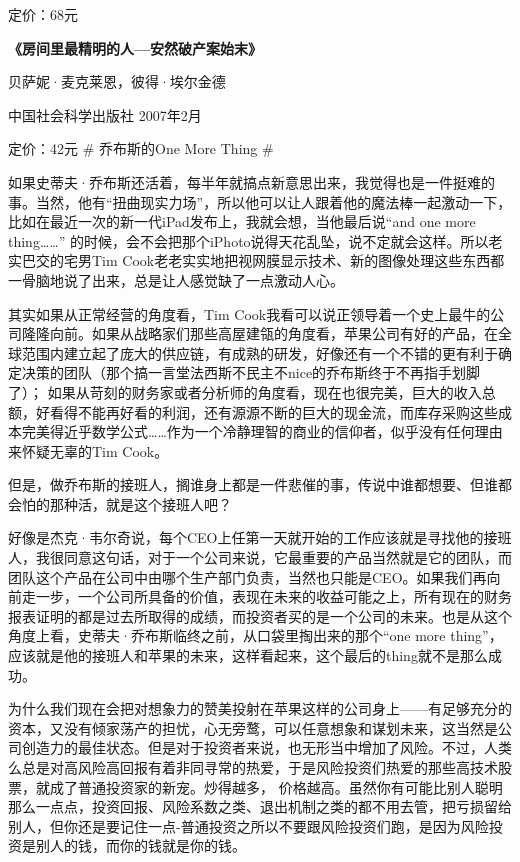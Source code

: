 定价：68元

\textbf{《房间里最精明的人---安然破产案始末》}

贝萨妮·麦克莱恩，彼得·埃尔金德

中国社会科学出版社 2007年2月

定价：42元 \# 乔布斯的One More Thing \#

如果史蒂夫·乔布斯还活着，每半年就搞点新意思出来，我觉得也是一件挺难的事。当然，他有``扭曲现实力场''，所以他可以让人跟着他的魔法棒一起激动一下，比如在最近一次的新一代iPad发布上，我就会想，当他最后说``and
one more thing\ldots{}\ldots{}''
的时候，会不会把那个iPhoto说得天花乱坠，说不定就会这样。所以老实巴交的宅男Tim
Cook老老实实地把视网膜显示技术、新的图像处理这些东西都一骨脑地说了出来，总是让人感觉缺了一点激动人心。

其实如果从正常经营的角度看，Tim
Cook我看可以说正领导着一个史上最牛的公司隆隆向前。如果从战略家们那些高屋建瓴的角度看，苹果公司有好的产品，在全球范围内建立起了庞大的供应链，有成熟的研发，好像还有一个不错的更有利于确定决策的团队（那个搞一言堂法西斯不民主不nice的乔布斯终于不再指手划脚了）；
如果从苛刻的财务家或者分析师的角度看，现在也很完美，巨大的收入总额，好看得不能再好看的利润，还有源源不断的巨大的现金流，而库存采购这些成本完美得近乎数学公式\ldots{}\ldots{}作为一个冷静理智的商业的信仰者，似乎没有任何理由来怀疑无辜的Tim
Cook。

但是，做乔布斯的接班人，搁谁身上都是一件悲催的事，传说中谁都想要、但谁都会怕的那种活，就是这个接班人吧？

好像是杰克·韦尔奇说，每个CEO上任第一天就开始的工作应该就是寻找他的接班人，我很同意这句话，对于一个公司来说，它最重要的产品当然就是它的团队，而团队这个产品在公司中由哪个生产部门负责，当然也只能是CEO。如果我们再向前走一步，一个公司所具备的价值，表现在未来的收益可能之上，所有现在的财务报表证明的都是过去所取得的成绩，而投资者买的是一个公司的未来。也是从这个角度上看，史蒂夫·乔布斯临终之前，从口袋里掏出来的那个``one
more
thing''，应该就是他的接班人和苹果的未来，这样看起来，这个最后的thing就不是那么成功。

为什么我们现在会把对想象力的赞美投射在苹果这样的公司身上------有足够充分的资本，又没有倾家荡产的担忧，心无旁鹜，可以任意想象和谋划未来，这当然是公司创造力的最佳状态。但是对于投资者来说，也无形当中增加了风险。不过，人类么总是对高风险高回报有着非同寻常的热爱，于是风险投资们热爱的那些高技术股票，就成了普通投资家的新宠。炒得越多，
价格越高。虽然你有可能比别人聪明那么一点点，投资回报、风险系数之类、退出机制之类的都不用去管，把亏损留给别人，但你还是要记住一点-普通投资之所以不要跟风险投资们跑，是因为风险投资是别人的钱，而你的钱就是你的钱。

